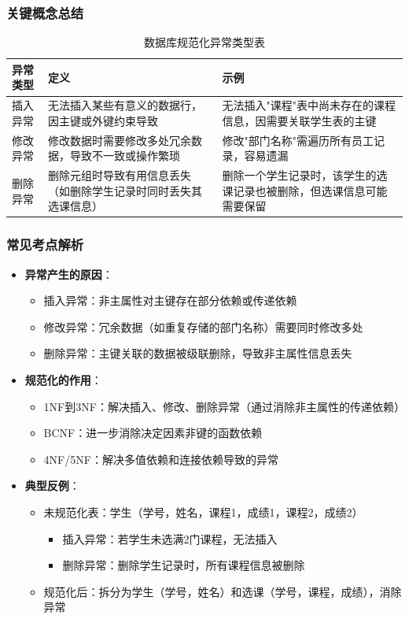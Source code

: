\documentclass[a4paper,12pt,UTF8,fontset=none]{ctexart}
\begin{document}
\subsubsection{关键概念总结}
\begin{table}[htbp]
    \centering
    \caption{数据库规范化异常类型表}
    \begin{tabular}{p{3cm}p{6cm}p{6cm}}
        \toprule
        \textbf{异常类型} & \textbf{定义} & \textbf{示例} \\
        \midrule
        插入异常 & 无法插入某些有意义的数据行，因主键或外键约束导致 & 无法插入"课程"表中尚未存在的课程信息，因需要关联学生表的主键 \\
        修改异常 & 修改数据时需要修改多处冗余数据，导致不一致或操作繁琐 & 修改"部门名称"需遍历所有员工记录，容易遗漏 \\
        删除异常 & 删除元组时导致有用信息丢失（如删除学生记录时同时丢失其选课信息） & 删除一个学生记录时，该学生的选课记录也被删除，但选课信息可能需要保留 \\
        \bottomrule
    \end{tabular}
\end{table}

\subsubsection{常见考点解析}
\begin{itemize}
    \item \textbf{异常产生的原因}：
    \begin{itemize}
        \item 插入异常：非主属性对主键存在部分依赖或传递依赖
        \item 修改异常：冗余数据（如重复存储的部门名称）需要同时修改多处
        \item 删除异常：主键关联的数据被级联删除，导致非主属性信息丢失
    \end{itemize}

    \item \textbf{规范化的作用}：
    \begin{itemize}
        \item 1NF到3NF：解决插入、修改、删除异常（通过消除非主属性的传递依赖）
        \item BCNF：进一步消除决定因素非键的函数依赖
        \item 4NF/5NF：解决多值依赖和连接依赖导致的异常
    \end{itemize}

    \item \textbf{典型反例}：
    \begin{itemize}
        \item 未规范化表：学生（学号，姓名，课程1，成绩1，课程2，成绩2）
        \begin{itemize}
            \item 插入异常：若学生未选满2门课程，无法插入
            \item 删除异常：删除学生记录时，所有课程信息被删除
        \end{itemize}
        \item 规范化后：拆分为学生（学号，姓名）和选课（学号，课程，成绩），消除异常
    \end{itemize}
\end{itemize}
\end{document}
